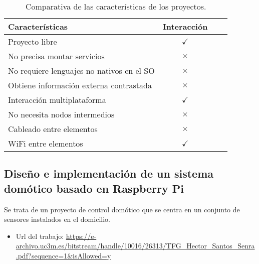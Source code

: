 \begin{table}[H]
\centering
\begin{tabular}{lccc}
\toprule
Características & Interacción  \\
\midrule
Proyecto libre                          & \cellcolor{green!25} {$\checkmark$}\\
No precisa montar servicios             &  \cellcolor{red!25} {$\times$}  \\
No requiere lenguajes no nativos en el SO & \cellcolor{red!25} {$\times$} \\
Obtiene información externa contrastada & \cellcolor{red!25} {$\times$} \\
Interacción multiplataforma             & \cellcolor{green!25} {$\checkmark$} \\
No necesita nodos intermedios           & \cellcolor{red!25} {$\times$} \\
Cableado entre elementos                & \cellcolor{red!25} {$\times$} \\
WiFi entre elementos                    & \cellcolor{green!25} {$\checkmark$} \\
\bottomrule
\end{tabular}
\caption{Comparativa de las características de los proyectos.}
\label{tabla_Interacción}
\end{table}

\subsection{Diseño e implementación de un sistema domótico basado en Raspberry Pi}
Se trata de un proyecto de control domótico que se centra en un conjunto de sensores instalados en el domicilio.

\begin{itemize}
    \item Url del trabajo: \url{https://e-archivo.uc3m.es/bitstream/handle/10016/26313/TFG_Hector_Santos_Senra.pdf?sequence=1&isAllowed=y}
\end{itemize}

